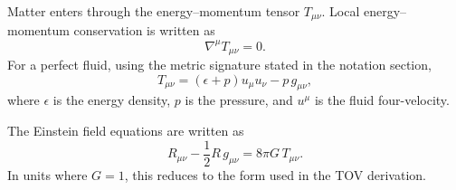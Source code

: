 Matter enters through the energy--momentum tensor \(T_{\mu\nu}\). Local
energy--momentum conservation is written as
\begin{equation}
    \nabla^\mu T_{\mu\nu}=0 .
\end{equation}
For a perfect fluid, using the metric signature stated in the notation section,
\begin{equation}
    T_{\mu\nu}
    =
    (\epsilon+p)u_\mu u_\nu
    -
    p\,g_{\mu\nu},
    \label{eq:perfect_fluid_Tmn}
\end{equation}
where \(\epsilon\) is the energy density, \(p\) is the pressure, and \(u^\mu\)
is the fluid four-velocity.

The Einstein field equations are written as
\begin{equation}
    R_{\mu\nu}
    -
    \frac{1}{2}R\,g_{\mu\nu}
    =
    8\pi G\,T_{\mu\nu}.
    \label{eq:einstein_equation}
\end{equation}
In units where \(G=1\), this reduces to the form used in the TOV derivation.